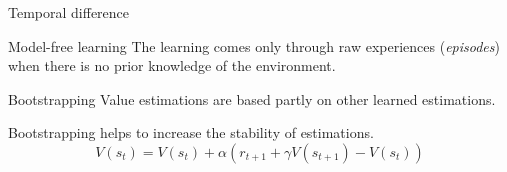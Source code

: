 \documentclass[aspectratio=169]{beamer}
\begin{document}
\begin{frame}{Temporal difference}
	\begin{alertblock}{Model-free learning} 
	The learning comes only through raw experiences (\textit{episodes}) when there is no prior knowledge of the environment.
	\end{alertblock}
	
	\begin{alertblock}{Bootstrapping} 
	Value estimations are based partly on other learned estimations.
	\end{alertblock}
	Bootstrapping helps to increase the stability of estimations.
	$$ V(s_t) = V(s_t)  + \alpha (r_{t+1} + \gamma V(s_{t+1}) - V(s_t)) $$
\end{frame}

%	
\end{document}
